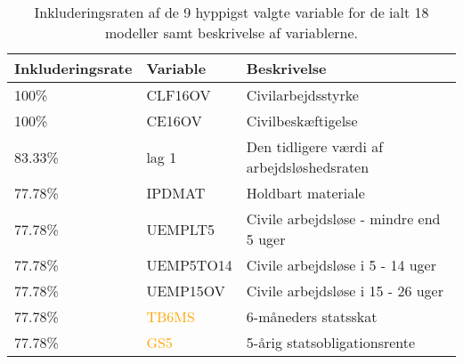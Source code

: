 \begin{table}[ht] 
\centering 
\begin{tabular}{lll}
\toprule 
Inkluderingsrate & Variable & Beskrivelse \\ \midrule
100\% &\textcolor{blue3}{CLF16OV} & Civilarbejdsstyrke \\
100\% &\textcolor{blue3}{CE16OV} & Civilbeskæftigelse \\
83.33\% & \textcolor{blue3}{lag 1} & Den tidligere værdi af arbejdsløshedsraten \\
77.78\% & \textcolor{chartreuse4}{IPDMAT} & Holdbart materiale  \\
77.78\% & \textcolor{blue3}{UEMPLT5} & Civile arbejdsløse - mindre end 5 uger \\
77.78\% & \textcolor{blue3}{UEMP5TO14}& Civile arbejdsløse i 5 - 14 uger \\
77.78\% & \textcolor{blue3}{UEMP15OV} &  Civile arbejdsløse i 15 - 26 uger  \\
77.78\% & \textcolor{orange}{TB6MS} & 6-måneders statsskat  \\
77.78\% & \textcolor{orange}{GS5} & 5-årig statsobligationsrente \\
\bottomrule
\end{tabular}  
\caption{Inkluderingsraten af de 9 hyppigst valgte variable for de ialt 18 modeller samt beskrivelse af variablerne.} \label{tab:topvariable}
\end{table} 